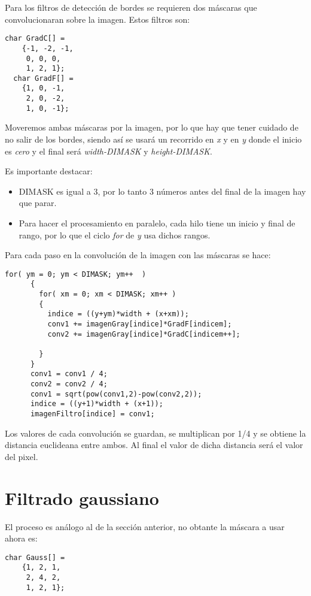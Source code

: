 \documentclass[11pt,a4paper]{article}
\begin{document}
Para los filtros de detección de bordes se requieren dos máscaras que convolucionaran sobre la imagen. Estos filtros son:


\lstset{language=C, breaklines=true, basicstyle=\footnotesize}
\lstset{numbers=left, numberstyle=\tiny, stepnumber=1, numbersep=-2pt}
\begin{lstlisting}[frame=single]
char GradC[] =
    {-1, -2, -1,
     0, 0, 0,
     1, 2, 1};
  char GradF[] =
    {1, 0, -1,
     2, 0, -2,
	 1, 0, -1};
\end{lstlisting}

Moveremos ambas máscaras por la imagen, por lo que hay que tener cuidado de no salir de los bordes, siendo así se usará un recorrido en \textit{x} y en \textit{y} donde el inicio es \textit{cero} y el final será \textit{width-DIMASK} y \textit{height-DIMASK}.

Es importante destacar:
\begin{itemize}
\item DIMASK es igual a 3, por lo tanto 3 números antes del final de la imagen hay que parar.
\item Para hacer el procesamiento en paralelo, cada hilo tiene un inicio y final de rango, por lo que el ciclo \textit{for} de \textit{y} usa dichos rangos.
\end{itemize}


Para cada paso en la convolución de la imagen con las máscaras se hace:

\lstset{language=C, breaklines=true, basicstyle=\footnotesize}
\lstset{numbers=left, numberstyle=\tiny, stepnumber=1, numbersep=-2pt}
\begin{lstlisting}[frame=single]
for( ym = 0; ym < DIMASK; ym++  )
      {
        for( xm = 0; xm < DIMASK; xm++ )
        {
          indice = ((y+ym)*width + (x+xm));
          conv1 += imagenGray[indice]*GradF[indicem];
          conv2 += imagenGray[indice]*GradC[indicem++];

        }
      }
      conv1 = conv1 / 4;
      conv2 = conv2 / 4;
      conv1 = sqrt(pow(conv1,2)-pow(conv2,2));
      indice = ((y+1)*width + (x+1));
      imagenFiltro[indice] = conv1;
\end{lstlisting}

Los valores de cada convolución se guardan, se multiplican por 1/4 y se obtiene la distancia euclideana entre ambos. Al final el valor de dicha distancia será el valor del pixel.


\section{Filtrado gaussiano}
El proceso es análogo al de la sección anterior, no obtante la máscara a usar ahora es:
\lstset{language=C, breaklines=true, basicstyle=\footnotesize}
\lstset{numbers=left, numberstyle=\tiny, stepnumber=1, numbersep=-2pt}
\begin{lstlisting}[frame=single]
char Gauss[] =
    {1, 2, 1,
     2, 4, 2,
     1, 2, 1};
\end{lstlisting}
\end{document}
